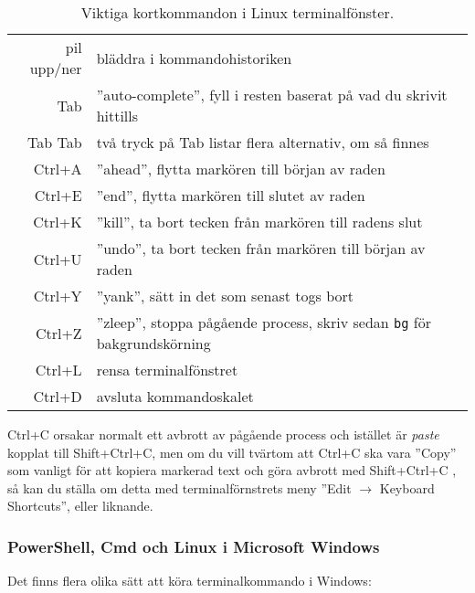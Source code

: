 \begin{table}[H]
\renewcommand{\arraystretch}{1.15}
\begin{tabular}{@{}r | l}
pil upp/ner & bläddra i kommandohistoriken \\
Tab & ''auto-complete'', fyll i resten baserat på vad du skrivit hittills \\
Tab Tab & två tryck på Tab listar flera alternativ, om så finnes \\
Ctrl+A & ''ahead'', flytta markören till början av raden \\
Ctrl+E & ''end'', flytta markören till slutet av raden \\
Ctrl+K & ''kill'', ta bort tecken från markören till radens slut\\
Ctrl+U & ''undo'', ta bort tecken från markören till början av raden \\
Ctrl+Y & ''yank'', sätt in det som senast togs bort\\
Ctrl+Z & ''zleep'', stoppa pågående process, skriv sedan \texttt{bg} för bakgrundskörning\\
Ctrl+L & rensa terminalfönstret\\
Ctrl+D & avsluta kommandoskalet \\
\end{tabular}
    \caption{Viktiga kortkommandon i Linux terminalfönster.}
    \label{fig:terminal:shortcuts}
\end{table}

\noindent Ctrl+C orsakar normalt ett avbrott av pågående process och istället är \emph{paste} kopplat till Shift+Ctrl+C, men om du vill tvärtom att Ctrl+C ska vara ''Copy'' som vanligt för att kopiera markerad text och göra avbrott med Shift+Ctrl+C , så kan du ställa om detta med terminalförnstrets  meny ''Edit $\rightarrow$ Keyboard Shortcuts'', eller liknande.




 
\subsubsection{PowerShell, Cmd och Linux i Microsoft Windows}
Det finns flera olika sätt att köra terminalkommando i Windows:

